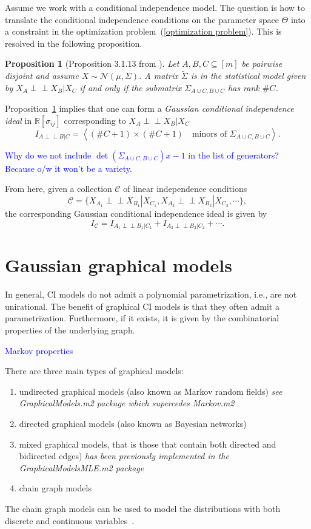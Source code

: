 \documentclass[10pt,a4paper]{article}
\newtheorem{proposition}{Proposition}
\newcommand{\indep}{\perp \!\!\! \perp}
\begin{document}
Assume we work with a conditional independence model. The question is how to translate the conditional independence conditions on the parameter space $\Theta$ into a constraint in the optimization problem~(\ref{optimization problem}). This is resolved in the following proposition.
\begin{proposition}[Proposition 3.1.13 from \cite{drton2008lectures}]\label{prop: CI submatrix condition}
Let $A,B,C\subseteq[m]$ be pairwise disjoint and assume  $X\sim \mathcal{N}(\mu, \Sigma)$. A matrix $\tilde{\Sigma}$ is in the statistical model given by $X_A\indep X_B|X_C$ if and only if the submatrix $\Sigma_{A\cup C,B \cup C}$ has rank $\#C$.
\end{proposition}

Proposition~\ref{prop: CI submatrix condition} implies that one can form a \emph{Gaussian conditional independence ideal} in $\mathbb{R}[\sigma_{ij}]$ corresponding to $X_A\indep X_B|X_C$ 
\[I_{A \indep B|C}=\left\langle (\#C+1)\times (\#C+1) \quad \text{minors of } \Sigma_{A\cup C,B \cup C} \right \rangle.\]

\textcolor{blue}{Why do we not include $\det(\Sigma_{A\cup C,B \cup C})x-1$ in the list of generators? Because o/w it won't be a variety.}

From here, given a collection $\mathcal{C}$ of linear independence conditions 
\[\mathcal{C}=\{X_{A_1}\indep X_{B_1}|X_{C_1},X_{A_2}\indep X_{B_2}|X_{C_2},\cdots\},\]
the corresponding Gaussian conditional independence ideal is given by
\[I_\mathcal{C}=I_{A_1\indep B_1|C_1}+I_{A_2\indep B_2|C_2}+\cdots.\]


\section{Gaussian graphical models}
In general, CI models do not admit a polynomial parametrization, i.e., are not unirational. The benefit of graphical CI models is that they often admit a parametrization. Furthermore, if it exists, it is given  by the combinatorial properties of the underlying graph.

\textcolor{blue}{Markov properties \cite[Section 3.2]{lauritzen1996graphical}}

There are three main types of graphical models:
\begin{enumerate}
\item undirected graphical models (also known as Markov random fields) \emph{see GraphicalModels.m2 package which supercedes Markov.m2}
\item directed graphical models (also known as Bayesian networks)
\item mixed graphical models, that is those that contain both directed and bidirected edges) \emph{has been previously implemented in the GraphicalModelsMLE.m2 package}
\item chain graph models 
\end{enumerate}
The chain graph models can be used to model the distributions with both discrete and continuous variables~\cite[Chapter 6.1.1]{lauritzen1996graphical}.
\end{document}
